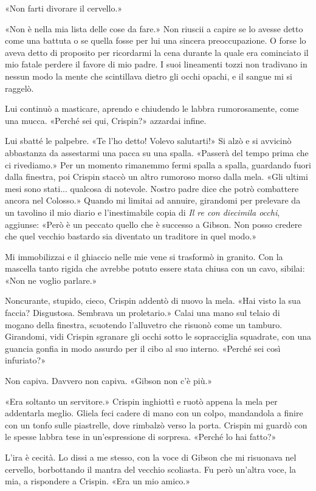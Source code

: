 «Non farti divorare il cervello.»

«Non è nella mia lista delle cose da fare.» Non riuscii a capire se lo
avesse detto come una battuta o se quella fosse per lui una sincera
preoccupazione. O forse lo aveva detto di proposito per ricordarmi la
cena durante la quale era cominciato il mio fatale perdere il favore di
mio padre. I suoi lineamenti tozzi non tradivano in nessun modo la mente
che scintillava dietro gli occhi opachi, e il sangue mi si raggelò.

Lui continuò a masticare, aprendo e chiudendo le labbra rumorosamente,
come una mucca. «Perché sei qui, Crispin?» azzardai infine.

Lui sbatté le palpebre. «Te l'ho detto! Volevo salutarti!» Si alzò e si
avvicinò abbastanza da assestarmi una pacca su una spalla. «Passerà del
tempo prima che ci rivediamo.» Per un momento rimanemmo fermi spalla a
spalla, guardando fuori dalla finestra, poi Crispin staccò un altro
rumoroso morso dalla mela. «Gli ultimi mesi sono stati... qualcosa di
notevole. Nostro padre dice che potrò combattere ancora nel Colosso.»
Quando mi limitai ad annuire, girandomi per prelevare da un tavolino il
mio diario e l'inestimabile copia di \emph{Il re con diecimila occhi},
aggiunse: «Però è un peccato quello che è successo a Gibson. Non posso
credere che quel vecchio bastardo sia diventato un traditore in quel
modo.»

Mi immobilizzai e il ghiaccio nelle mie vene si trasformò in {granito}.
Con la mascella tanto rigida che avrebbe potuto essere stata chiusa con
un cavo, sibilai: «Non ne voglio parlare.»

Noncurante, stupido, cieco, Crispin addentò di nuovo la mela. «Hai visto
la sua faccia? Disgustosa. Sembrava un proletario.» Calai una mano sul
telaio di mogano della finestra, scuotendo l'alluvetro che risuonò come
un tamburo. Girandomi, vidi Crispin sgranare gli occhi sotto le
sopracciglia squadrate, con una guancia gonfia in modo assurdo per il
cibo al suo interno. «Perché sei così infuriato?»

Non capiva. Davvero non capiva. «Gibson non c'è più.»

«Era soltanto un servitore.» Crispin inghiottì e ruotò appena la mela
per addentarla meglio. Gliela feci cadere di mano con un colpo,
mandandola a finire con un tonfo sulle piastrelle, dove rimbalzò verso
la porta. Crispin mi guardò con le spesse labbra tese in un'espressione
di sorpresa. «Perché lo hai fatto?»

L'ira è cecità. Lo dissi a me stesso, con la voce di Gibson che mi
risuonava nel cervello, borbottando il mantra del vecchio scoliasta. Fu
però un'altra voce, la mia, a rispondere a Crispin. «Era un mio amico.»

